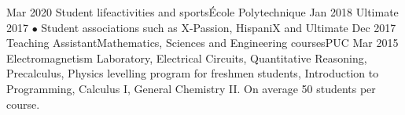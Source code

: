 %
%
%

\begin{experiences}
\experience
    {Mar 2020} {Student life}{activities and sports}{École Polytechnique}
    {Jan 2018} { Ultimate 2017 $\bullet$ Student associations such as X-Passion, HispaniX and Ultimate}
        {}
  \experience
    {Dec 2017} {Teaching Assistant}{Mathematics, Sciences and Engineering courses}{PUC}
    {Mar 2015} 
    {Electromagnetism Laboratory, Electrical Circuits, Quantitative Reasoning, Precalculus, Physics levelling program for freshmen students, Introduction to Programming, Calculus I, General Chemistry II. On average 50 students per course.}
        {}
\end{experiences}